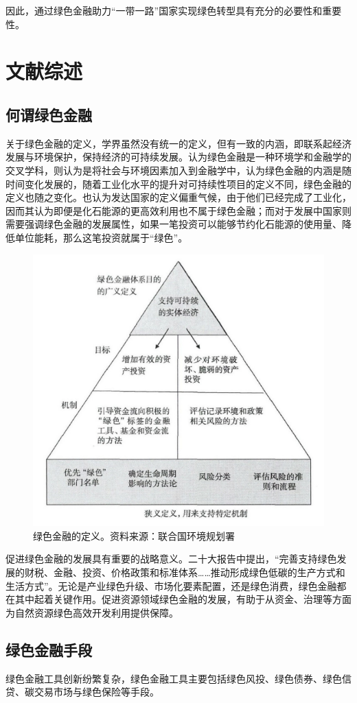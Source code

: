 \documentclass[a4paper,12pt]{ctexart}
\begin{document}
因此，通过绿色金融助力“一带一路”国家实现绿色转型具有充分的必要性和重要性。

\section*{文献综述}
\subsection*{何谓绿色金融}
关于绿色金融的定义，学界虽然没有统一的定义，但有一致的内涵，即联系起经济发展与环境保护，保持经济的可持续发展\cite{雷立钧2009绿色金融文献综述}。\citet{cowan1998topical}认为绿色金融是一种环境学和金融学的交叉学科，\citet{gray2002messiness}则认为是将社会与环境因素加入到金融学中，\citet{hohne2012mapping}认为绿色金融的内涵是随时间变化发展的，随着工业化水平的提升对可持续性项目的定义不同，绿色金融的定义也随之变化。\citet*{张承惠2016发展中国绿色金融的逻辑与框架}也认为发达国家的定义偏重气候，由于他们已经完成了工业化，因而其认为即便是化石能源的更高效利用也不属于绿色金融；而对于发展中国家则需要强调绿色金融的发展属性，如果一笔投资可以能够节约化石能源的使用量、降低单位能耗，那么这笔投资就属于“绿色”。
\begin{figure}[H]
    \centering
    \includegraphics[width=0.5\linewidth]{./img/绿色金融定义.jpeg}
    \caption{绿色金融的定义。资料来源：联合国环境规划署}
\end{figure}

促进绿色金融的发展具有重要的战略意义。二十大报告中提出，“完善支持绿色发展的财税、金融、投资、价格政策和标准体系……推动形成绿色低碳的生产方式和生活方式”。无论是产业绿色升级、市场化要素配置，还是绿色消费，绿色金融都在其中起着关键作用。促进资源领域绿色金融的发展，有助于从资金、治理等方面为自然资源绿色高效开发利用提供保障\cite{王遥2016绿色金融对中国经济发展的贡献研究}。

\subsection*{绿色金融手段}
绿色金融工具创新纷繁复杂，绿色金融工具主要包括绿色风投、绿色债券、绿色信贷、碳交易市场与绿色保险等手段\cite{姚秋池2017国内外绿色金融研究综述}。
\end{document}
